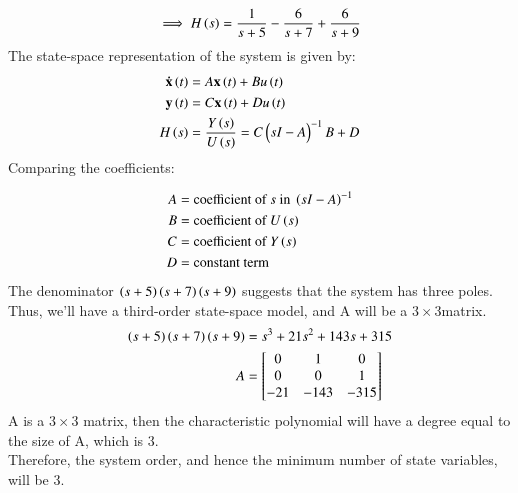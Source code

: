 \documentclass[a4,12pt,onecolumn]{IEEEtran}
\newcommand{\mybmat}[1]{\ensuremath{\begin{bmatrix}#1\end{bmatrix}}}
\begin{document}
\begin{align}
\implies H\left(s\right)&=\frac{1}{s+5} -\frac{6}{s+7} + \frac{6}{s+9}\\
\end{align}
The state-space representation of the system is given by:
\begin{align}
\mathbf{\dot{x}}\left(t\right) &=A\mathbf{x}\left(t\right) + Bu\left(t\right)\\
\mathbf{y}\left(t\right) &= C\mathbf{x}\left(t\right) + Du\left(t\right)\\
H\left(s\right)&=\frac{Y\left(s\right)}{U\left(s\right)}=C\begin{pmatrix}sI-A\end{pmatrix}^{-1}B + D  
\end{align}
Comparing the coefficients:

\begin{align}
A &= \text{coefficient of } s \text{ in } \left(sI-A\right)^{-1} \\
B &= \text{coefficient of }  U\left(s\right)\\
C &= \text{coefficient of } Y\left(s\right) \\
D &= \text{constant term}
\end{align}
 The denominator $\left(s+5\right)\left(s+7\right)\left(s+9\right)$ suggests that the system has three poles. Thus, we'll have a third-order state-space model, and A will be a $3\times 3$matrix.
\begin{align}
\brak{s+5}\brak{s+7}\brak{s+9} &=s^3+21s^2+143s+315\\
A &=  \mybmat{0 & 1&0 \\ 0 & 0&1\\-21&-143&-315}\\
\end{align}
A is a $ 3\times 3$ matrix, then the characteristic polynomial will have a degree equal to the size of A, which is $3$.\\
Therefore, the system order, and hence the minimum number of state variables, will be 3.\\
\end{document}
